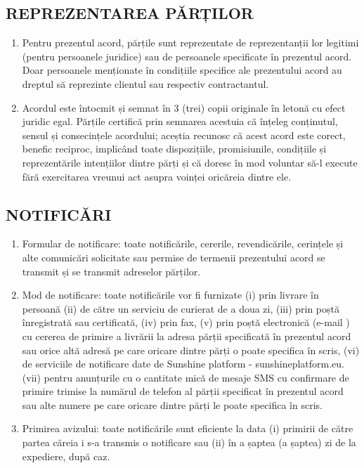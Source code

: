 \begin{multicols}{2}
\subsection{REPREZENTAREA PĂRȚILOR}
\begin{enumerate}
\item Pentru prezentul acord, părțile sunt reprezentate de reprezentanții lor legitimi (pentru persoanele juridice) sau de persoanele specificate în prezentul acord. Doar persoanele menționate în condițiile specifice ale prezentului acord au dreptul să reprezinte clientul sau respectiv contractantul.
\item Acordul este întocmit și semnat în 3 (trei) copii originale în letonă cu efect juridic egal. Părțile certifică prin semnarea acestuia că înțeleg conținutul, sensul și consecințele acordului; aceștia recunosc că acest acord este corect, benefic reciproc, implicând toate dispozițiile, promisiunile, condițiile și reprezentările intențiilor dintre părți și că doresc în mod voluntar să-l execute fără exercitarea vreunui act asupra voinței oricăreia dintre ele.
\end{enumerate}

\subsection{NOTIFICĂRI}
\begin{enumerate}
\item Formular de notificare: toate notificările, cererile, revendicările, cerințele și alte comunicări solicitate sau permise de termenii prezentului acord se transmit și se transmit adreselor părților.
  \item Mod de notificare: toate notificările vor fi furnizate (i) prin livrare în persoană (ii) de către un serviciu de curierat de a doua zi, (iii) prin poștă înregistrată sau certificată, (iv) prin fax, (v) prin poștă electronică (e-mail ) cu cererea de primire a livrării la adresa părții specificată în prezentul acord sau orice altă adresă pe care oricare dintre părți o poate specifica în scris, (vi) de serviciile de notificare date de Sunshine platform - sunshineplatform.eu. (vii) pentru anunțurile cu o cantitate mică de mesaje SMS cu confirmare de primire trimise la numărul de telefon al părții specificat în prezentul acord sau alte numere pe care oricare dintre părți le poate specifica în scris.
  \item Primirea avizului: toate notificările sunt eficiente la data (i) primirii de către partea căreia i s-a transmis o notificare sau (ii) în a șaptea (a șaptea) zi de la expediere, după caz.
\end{enumerate}

\end{multicols}
